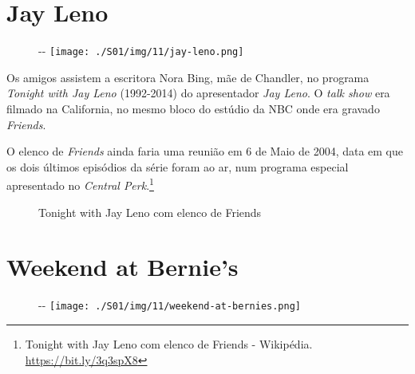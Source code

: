\hypertarget{jay-leno}{%
\section{Jay Leno}\label{jay-leno}}

\begin{figure}[!ht]
  \begin{adjustwidth}{-\oddsidemargin-1in}{-\rightmargin}
    \centering
    \texttt{[image: ./S01/img/11/jay-leno.png]}
  \end{adjustwidth}
\end{figure}

Os amigos assistem a escritora Nora Bing, mãe de Chandler, no programa
\emph{Tonight with Jay Leno} (1992-2014) do apresentador \emph{Jay
Leno}. O \emph{talk show} era filmado na California, no mesmo bloco do
estúdio da NBC onde era gravado \emph{Friends}.

O elenco de \emph{Friends} ainda faria uma reunião em 6 de Maio de 2004,
data em que os dois últimos episódios da série foram ao ar, num programa
especial apresentado no \emph{Central Perk}.\footnote{\sloppy Tonight with Jay Leno com elenco de Friends - Wikipédia. \url{https://bit.ly/3q3spX8}}

\begin{figure}
  \centering
    \caption{Tonight with Jay Leno com elenco de Friends\label{fig:tonight-with-jay-leno-com-elenco-de-friends}}
\end{figure}

\hypertarget{weekend-at-bernies}{%
\section{Weekend at Bernie's}\label{weekend-at-bernies}}

\begin{figure}[!ht]
  \begin{adjustwidth}{-\oddsidemargin-1in}{-\rightmargin}
    \centering
    \texttt{[image: ./S01/img/11/weekend-at-bernies.png]}
  \end{adjustwidth}
\end{figure}

